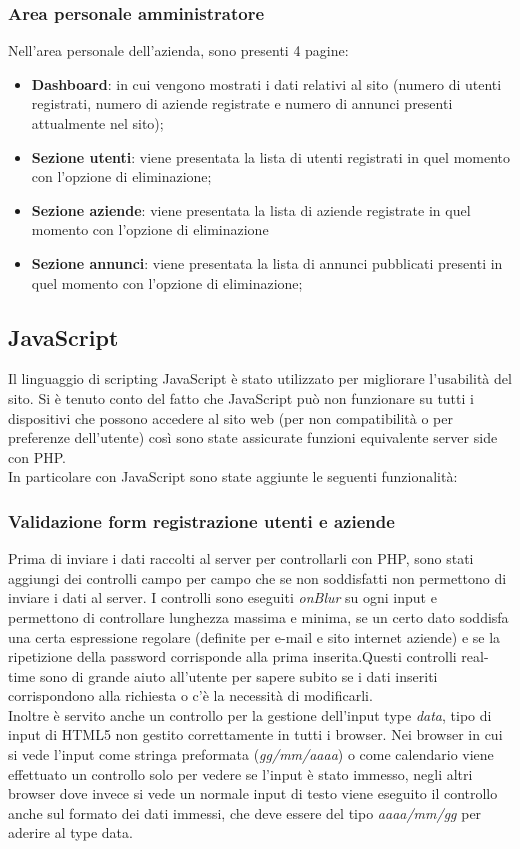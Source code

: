 		\subsubsection{Area personale amministratore}
		Nell'area personale dell'azienda, sono presenti 4 pagine:
		\begin{itemize}
			\item \textbf{Dashboard}: in cui vengono mostrati i dati relativi al sito (numero di utenti registrati, numero di aziende registrate e numero di annunci presenti attualmente nel sito);
			\item \textbf{Sezione utenti}: viene presentata la lista di utenti registrati in quel momento con l'opzione di eliminazione;
			\item \textbf{Sezione aziende}: viene presentata la lista di aziende registrate in quel momento con l'opzione di eliminazione
			\item \textbf{Sezione annunci}: viene presentata la lista di annunci pubblicati presenti in quel momento con l'opzione di eliminazione;
		\end{itemize}
	 
	\subsection{JavaScript}
	 Il linguaggio di scripting JavaScript è stato utilizzato per migliorare l'usabilità del sito. Si è tenuto conto del fatto che JavaScript può non funzionare su tutti i dispositivi che possono accedere al sito web (per non compatibilità o per preferenze dell'utente) così sono state assicurate funzioni equivalente server side con PHP.\\
	 In particolare con JavaScript sono state aggiunte le seguenti funzionalità:
	 
		\subsubsection{Validazione form registrazione utenti e aziende}
		Prima di inviare i dati raccolti al server per controllarli con PHP, sono stati aggiungi dei controlli campo per campo che se non soddisfatti non permettono di inviare i dati al server.
		I controlli sono eseguiti \emph{onBlur} su ogni input e permettono di controllare lunghezza massima e minima, se un certo dato soddisfa una certa espressione regolare (definite per e-mail e sito internet aziende) e se la ripetizione della password corrisponde alla prima inserita.Questi controlli real-time sono di grande aiuto all'utente per sapere subito se i dati inseriti corrispondono alla richiesta o c'è la necessità di modificarli.\\
		Inoltre è servito anche un controllo per la gestione dell'input type \emph{data}, tipo di input di HTML5 non gestito correttamente in tutti i browser. Nei browser in cui si vede l'input come stringa preformata (\emph{gg/mm/aaaa}) o come calendario viene effettuato un controllo solo per vedere se l'input è stato immesso, negli altri browser dove invece si vede un normale input di testo viene eseguito il controllo anche sul formato dei dati immessi, che deve essere del tipo \emph{aaaa/mm/gg} per aderire al type data.
		
